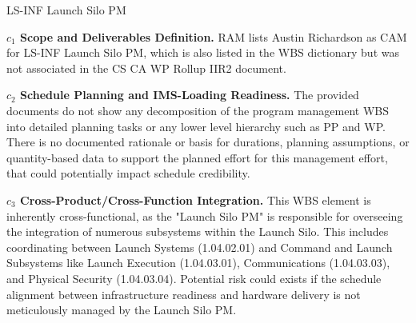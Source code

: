 \begin{frame}{LS-INF Launch Silo PM}
\begin{minipage}{0.90\textwidth}
\raggedright
\fontsize{8}{9.5}\selectfont
\textbf{\(c_1\) Scope and Deliverables Definition.}
RAM lists Austin Richardson as CAM for LS-INF Launch Silo PM, which is also listed in the WBS dictionary but was not associated in the CS CA WP Rollup IIR2 document.\par\vspace{0.6em}
\textbf{\(c_2\) Schedule Planning and IMS-Loading Readiness.}
The provided documents do not show any decomposition of the program management WBS into detailed planning tasks or any lower level hierarchy such as PP and WP. There is no documented rationale or basis for durations, planning assumptions, or quantity-based data to support the planned effort for this management effort, that could potentially impact schedule credibility.\par\vspace{0.6em}
\textbf{\(c_3\) Cross-Product/Cross-Function Integration.}
This WBS element is inherently cross-functional, as the "Launch Silo PM" is responsible for overseeing the integration of numerous subsystems within the Launch Silo. This includes coordinating between Launch Systems (1.04.02.01) and Command and Launch Subsystems like Launch Execution (1.04.03.01), Communications (1.04.03.03), and Physical Security (1.04.03.04). Potential risk could exists if the schedule alignment between infrastructure readiness and hardware delivery is not meticulously managed by the Launch Silo PM.\par\vspace{0.6em}
\end{minipage}
\end{frame}

\endinput
